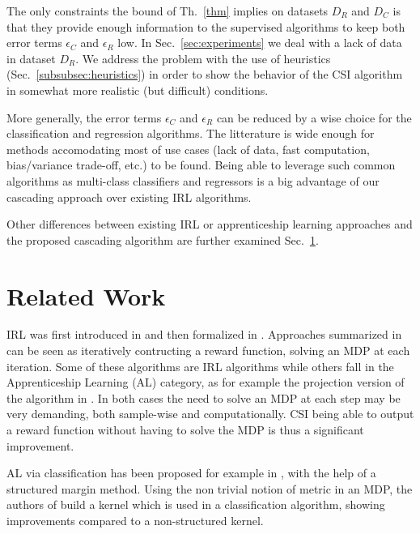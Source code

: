 \documentclass[smallextended]{svjour3}
\begin{document}
The only constraints the bound of Th.~\ref{thm} implies on datasets $D_R$ and $D_C$ is that they provide enough information to the supervised algorithms to keep both error terms $\epsilon_C$ and $\epsilon_R$ low. In Sec.~\ref{sec:experiments} we deal with a lack of data in dataset $D_R$. We address the problem with the use of heuristics (Sec.~\ref{subsubsec:heuristics}) in order to show the behavior of the CSI algorithm in somewhat more realistic (but difficult) conditions.

More generally, the error terms  $\epsilon_C$ and $\epsilon_R$ can be reduced by a wise choice for the classification and regression algorithms. The litterature is wide enough for methods accomodating most of use cases (lack of data, fast computation, bias/variance trade-off, etc.) to be found. Being able to leverage such common algorithms as multi-class classifiers and regressors is a big advantage of our cascading approach over existing IRL algorithms.

Other differences between existing IRL or apprenticeship learning approaches and the proposed cascading algorithm are further examined Sec.~\ref{sec:related}.


\section{Related Work}
\label{sec:related}
IRL was first introduced in \cite{russell1998learning} and then formalized in \cite{ng2000algorithms}. Approaches summarized in \cite{neu2009training} can be seen as iteratively contructing a reward function, solving an MDP at each iteration. Some of these algorithms are IRL algorithms while others fall in the Apprenticeship Learning (AL) category, as for example the projection version of the algorithm in \cite{abbeel2004apprenticeship}. In both cases the need to solve an MDP at each step may be very demanding, both sample-wise and computationally. CSI being able to output a reward function without having to solve the MDP is thus a significant improvement.

AL via classification has been proposed for example in \cite{ratliff2007imitation}, with the help of a structured margin method. Using the non trivial notion of metric in an MDP, the authors of \cite{melo2010learning} build a kernel which is used
in a classification algorithm, showing improvements compared to a
non-structured kernel.
\end{document}

